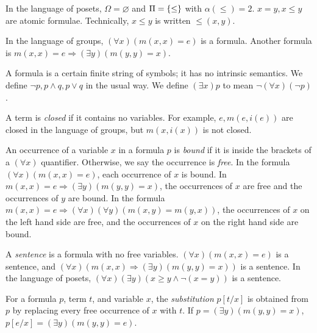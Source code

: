 \begin{example}
    In the language of posets, \( \Omega = \varnothing \) and \( \Pi = \qty{\leq} \) with \( \alpha(\leq) = 2 \).
    \( x = y, x \leq y \) are atomic formulae.
    Technically, \( x \leq y \) is written \( \leq(x, y) \).
\end{example}
\begin{example}
    In the language of groups, \( (\forall x) (m(x,x) = e) \) is a formula.
    Another formula is \( m(x,x) = e \Rightarrow (\exists y) (m(y,y) = x) \).
\end{example}
\begin{remark}
    A formula is a certain finite string of symbols; it has no intrinsic semantics.
    We define \( \neg p, p \wedge q, p \vee q \) in the usual way.
    We define \( (\exists x) p \) to mean \( \neg(\forall x) (\neg p) \).
\end{remark}
A term is \emph{closed} if it contains no variables.
For example, \( e, m(e,i(e)) \) are closed in the language of groups, but \( m(x,i(x)) \) is not closed.

An occurrence of a variable \( x \) in a formula \( p \) is \emph{bound} if it is inside the brackets of a \( (\forall x) \) quantifier.
Otherwise, we say the occurrence is \emph{free}.
In the formula \( (\forall x)(m(x,x) = e) \), each occurrence of \( x \) is bound.
In \( m(x,x) = e \Rightarrow (\exists y)(m(y,y) = x) \), the occurrences of \( x \) are free and the occurrences of \( y \) are bound.
In the formula \( m(x,x) = e \Rightarrow (\forall x)(\forall y)(m(x,y) = m(y,x)) \), the occurrences of \( x \) on the left hand side are free, and the occurrences of \( x \) on the right hand side are bound.

A \emph{sentence} is a formula with no free variables.
\( (\forall x)(m(x,x) = e) \) is a sentence, and \( (\forall x)(m(x,x) \Rightarrow (\exists y)(m(y,y) = x)) \) is a sentence.
In the language of posets, \( (\forall x)(\exists y)(x \geq y \wedge \neg(x = y)) \) is a sentence.

For a formula \( p \), term \( t \), and variable \( x \), the \emph{substitution} \( p[t/x] \) is obtained from \( p \) by replacing every free occurrence of \( x \) with \( t \).
If \( p = (\exists y)(m(y,y) = x) \), \( p[e/x] = (\exists y)(m(y,y) = e) \).


